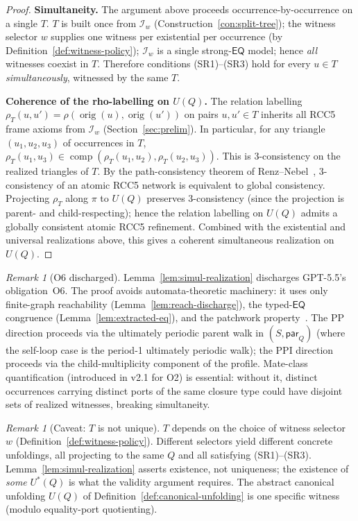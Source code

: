 \documentclass[11pt]{article}
\theoremstyle{definition}
\theoremstyle{remark}
\newtheorem{remark}[theorem]{Remark}
\newcommand{\EQ}{\mathsf{EQ}}
\newcommand{\comp}{\operatorname{comp}}
\newcommand{\orig}{\operatorname{orig}}
\begin{document}
\begin{proof}
\smallskip\noindent\textbf{Simultaneity.}\;
The argument above proceeds occurrence-by-occurrence on a single
$T$.  $T$ is built once from $\mathcal{I}_w$
(Construction~\ref{con:split-tree}); the witness selector $w$
supplies one witness per existential per occurrence (by
Definition~\ref{def:witness-policy}); $\mathcal{I}_w$ is a single
strong-$\EQ$ model; hence \emph{all} witnesses coexist in $T$.
Therefore conditions (SR1)--(SR3) hold for every $u\in T$
\emph{simultaneously}, witnessed by the same $T$.

\smallskip\noindent\textbf{Coherence of the rho-labelling on $U(Q)$.}\;
The relation labelling $\rho_T(u,u') = \rho(\orig(u),\orig(u'))$ on
pairs $u,u'\in T$ inherits all RCC5 frame axioms from $\mathcal{I}_w$
(Section~\ref{sec:prelim}).  In particular, for any triangle
$(u_1,u_2,u_3)$ of occurrences in $T$,
$\rho_T(u_1,u_3)\in\comp(\rho_T(u_1,u_2),\rho_T(u_2,u_3))$.  This is
$3$-consistency on the realized triangles of $T$.
By the path-consistency theorem of Renz--Nebel~\cite{RenzNebel},
$3$-consistency of an atomic RCC5 network is equivalent to global
consistency.  Projecting $\rho_T$ along $\pi$ to $U(Q)$ preserves
$3$-consistency (since the projection is parent- and
child-respecting); hence the relation labelling on $U(Q)$ admits a
globally consistent atomic RCC5 refinement.  Combined with the
existential and universal realizations above, this gives a coherent
simultaneous realization on $U(Q)$.
\end{proof}

\begin{remark}[O6 discharged]\label{rem:o6-discharged}
Lemma~\ref{lem:simul-realization} discharges GPT-5.5's
obligation~O6.  The proof avoids automata-theoretic machinery: it
uses only finite-graph reachability
(Lemma~\ref{lem:reach-discharge}), the typed-$\EQ$ congruence
(Lemma~\ref{lem:extracted-eq}), and the patchwork
property~\cite{RenzNebel}.  The PP direction proceeds via the
ultimately periodic parent walk in $(S,\mathsf{par}_Q)$ (where the
self-loop case is the period-1 ultimately periodic walk); the PPI
direction proceeds via the child-multiplicity component of the
profile.  Mate-class quantification (introduced in v2.1 for O2)
is essential: without it, distinct occurrences carrying distinct
ports of the same closure type could have disjoint sets of
realized witnesses, breaking simultaneity.
\end{remark}

\begin{remark}[Caveat: $T$ is not unique]\label{rem:T-not-unique}
$T$ depends on the choice of witness selector $w$
(Definition~\ref{def:witness-policy}).  Different selectors yield
different concrete unfoldings, all projecting to the same $Q$ and
all satisfying (SR1)--(SR3).  Lemma~\ref{lem:simul-realization}
asserts existence, not uniqueness; the existence of \emph{some}
$U^\ast(Q)$ is what the validity argument requires.  The abstract
canonical unfolding $U(Q)$ of
Definition~\ref{def:canonical-unfolding} is one specific witness
(modulo equality-port quotienting).
\end{remark}
\end{document}
